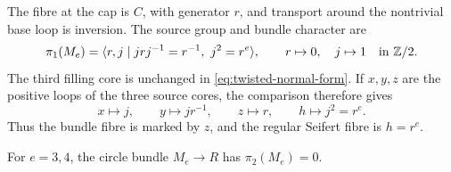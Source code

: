 The fibre at the cap is $C$, with generator $r$, and transport around the nontrivial base loop is inversion. The source group and bundle character are
\begin{equation}\label{eq:bundle-character}
\pi_1(M_e)=\langle r,j\mid jrj^{-1}=r^{-1},\ j^2=r^e\rangle,
\qquad r\mapsto0,\quad j\mapsto1\quad\text{in }\mathbb Z/2.
\end{equation}
The third filling core is unchanged in \eqref{eq:twisted-normal-form}. If $x,y,z$ are the positive loops of the three source cores, the comparison therefore gives
\[
x\longmapsto j,\qquad y\longmapsto jr^{-1},\qquad
z\longmapsto r,\qquad h\longmapsto j^2=r^e.
\]
Thus the bundle fibre is marked by $z$, and the regular Seifert fibre is $h=r^e$.

\begin{proposition}\label{prop:source-pi2}
For $e=3,4$, the circle bundle $M_e\to R$ has $\pi_2(M_e)=0$.
\end{proposition}
